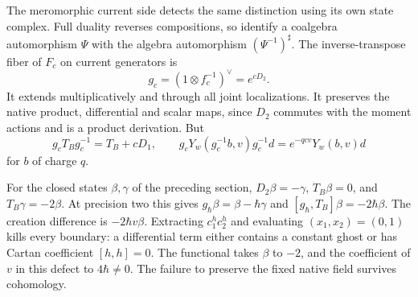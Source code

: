 The meromorphic current side detects the same distinction using its
own state complex. Full duality reverses compositions, so identify
a coalgebra automorphism $\Psi$ with the algebra automorphism
$(\Psi^{-1})^\sharp$. The inverse-transpose fiber of $F_c$ on
current generators is
\[
 g_c=(1\otimes f_c^{-1})^\vee=e^{cD_2}.
\]
It extends multiplicatively and through all joint localizations.
It preserves the native product, differential and scalar maps,
since $D_2$ commutes with the moment actions and is a product
derivation. But
\[
 g_cT_Bg_c^{-1}=T_B+cD_1,
 \qquad
 g_cY_w(g_c^{-1}b,v)g_c^{-1}d=e^{-qcv}Y_w(b,v)d
\]
for $b$ of charge $q$.

For the closed states $\beta,\gamma$ of the preceding section,
$D_2\beta=-\gamma$, $T_B\beta=0$, and $T_B\gamma=-2\beta$.
At precision two this gives
$g_\hbar\beta=\beta-\hbar\gamma$ and
$[g_\hbar,T_B]\beta=-2\hbar\beta$. The creation difference is
$-2\hbar v\beta$. Extracting $c_1^hc_2^h$ and evaluating
$(x_1,x_2)=(0,1)$ kills every boundary: a differential term
either contains a constant ghost or has Cartan coefficient
$[h,h]=0$. The functional takes $\beta$ to $-2$, and the
coefficient of $v$ in this defect to $4\hbar\ne0$.
The failure to preserve the fixed native field survives cohomology.

